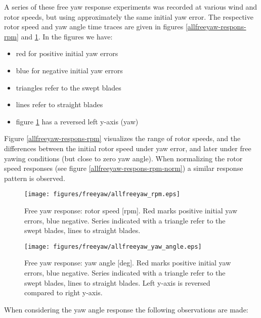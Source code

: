 \documentclass[a4paper]{jpconf}
\begin{document}
A series of these free yaw response experiments was recorded at various wind and rotor speeds, but using approximately the same initial yaw error. The respective rotor speed and yaw angle time traces are given in figures \ref{allfreeyaw-respons-rpm} and \ref{allfreeyaw-respons-yaw}. In the figures we have:
\begin{itemize}
	\item red for positive initial yaw errors
	\item blue for negative initial yaw errors
	\item triangles refer to the swept blades
	\item lines refer to straight blades
	\item figure \ref{allfreeyaw-respons-yaw} has a reversed left y-axis (yaw)
\end{itemize}

Figure \ref{allfreeyaw-respons-rpm} visualizes the range of rotor speeds, and the differences between the initial rotor speed under yaw error, and later under free yawing conditions (but close to zero yaw angle). When normalizing the rotor speed responses (see figure \ref{allfreeyaw-respons-rpm-norm}) a similar response pattern is observed. 

\begin{figure}[h]
\begin{minipage}{\textwidth}
\centering
\texttt{[image: figures/freeyaw/allfreeyaw\_rpm.eps]}
\caption{\label{allfreeyaw-respons-rpm} Free yaw response: rotor speed [rpm]. Red marks positive initial yaw errors, blue negative. Series indicated with a triangle refer to the swept blades, lines to straight blades.}
\end{minipage}
\begin{minipage}{\textwidth}
\centering
\texttt{[image: figures/freeyaw/allfreeyaw\_yaw\_angle.eps]}
\caption{\label{allfreeyaw-respons-yaw} Free yaw response: yaw angle [deg]. Red marks positive initial yaw errors, blue negative. Series indicated with a triangle refer to the swept blades, lines to straight blades. Left y-axis is reversed compared to right y-axis.}
\end{minipage} 
\end{figure}

When considering the yaw angle response the following observations are made:
\end{document}
